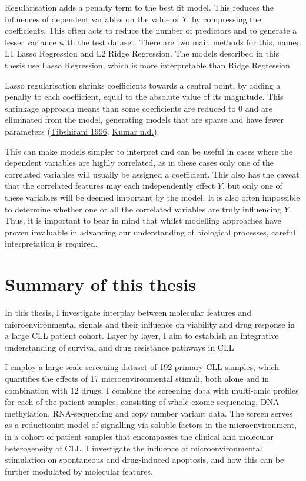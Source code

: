 \documentclass[11pt, a4paper, twosided]{book}
\begin{document}
Regularisation adds a penalty term to the best fit model. This reduces the influences of dependent variables on the value of \(Y\), by compressing the coefficients. This often acts to reduce the number of predictors and to generate a lesser variance with the test dataset. There are two main methods for this, named L1 Lasso Regression and L2 Ridge Regression. The models described in this thesis use Lasso Regression, which is more interpretable than Ridge Regression.

Lasso regularisation shrinks coefficients towards a central point, by adding a penalty to each coefficient, equal to the absolute value of its magnitude. This shrinkage approach means than some coefficients are reduced to 0 and are eliminated from the model, generating models that are sparse and have fewer parameters (\protect\hyperlink{ref-Tibshirani1996}{Tibshirani 1996}; \protect\hyperlink{ref-Kumar}{Kumar n.d.}).

This can make models simpler to interpret and can be useful in cases where the dependent variables are highly correlated, as in these cases only one of the correlated variables will usually be assigned a coefficient. This also has the caveat that the correlated features may each independently effect \(Y\), but only one of these variables will be deemed important by the model. It is also often impossible to determine whether one or all the correlated variables are truly influencing \(Y\). Thus, it is important to bear in mind that whilst modelling approaches have proven invaluable in advancing our understanding of biological processes, careful interpretation is required.

\hypertarget{summary-of-this-thesis}{%
\section{Summary of this thesis}\label{summary-of-this-thesis}}

In this thesis, I investigate interplay between molecular features and microenvironmental signals and their influence on viability and drug response in a large CLL patient cohort. Layer by layer, I aim to establish an integrative understanding of survival and drug resistance pathways in CLL.

I employ a large-scale screening dataset of 192 primary CLL samples, which quantifies the effects of 17 microenvironmental stimuli, both alone and in combination with 12 drugs. I combine the screening data with multi-omic profiles for each of the patient samples, consisting of whole-exome sequencing, DNA-methylation, RNA-sequencing and copy number variant data. The screen serves as a reductionist model of signalling via soluble factors in the microenvironment, in a cohort of patient samples that encompasses the clinical and molecular heterogeneity of CLL. I investigate the influence of microenvironmental stimulation on spontaneous and drug-induced apoptosis, and how this can be further modulated by molecular features.
\end{document}
